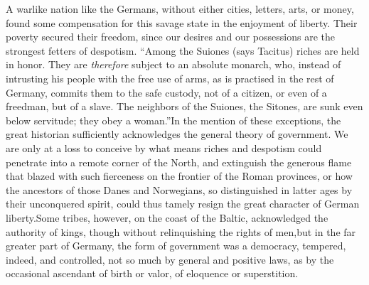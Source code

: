 


A warlike nation like the Germans, without either cities,
letters, arts, or money, found some compensation for this savage
state in the enjoyment of liberty. Their poverty secured their
freedom, since our desires and our possessions are the strongest
fetters of despotism. “Among the Suiones (says Tacitus) riches
are held in honor. They are \textit{therefore} subject to an absolute
monarch, who, instead of intrusting his people with the free use
of arms, as is practised in the rest of Germany, commits them to
the safe custody, not of a citizen, or even of a freedman, but of
a slave. The neighbors of the Suiones, the Sitones, are sunk even
below servitude; they obey a woman.”\footnotemark[41] In the mention of these
exceptions, the great historian sufficiently acknowledges the
general theory of government. We are only at a loss to conceive
by what means riches and despotism could penetrate into a remote
corner of the North, and extinguish the generous flame that
blazed with such fierceness on the frontier of the Roman
provinces, or how the ancestors of those Danes and Norwegians, so
distinguished in latter ages by their unconquered spirit, could
thus tamely resign the great character of German liberty.\footnotemark[42] Some
tribes, however, on the coast of the Baltic, acknowledged the
authority of kings, though without relinquishing the rights of
men,\footnotemark[43] but in the far greater part of Germany, the form of
government was a democracy, tempered, indeed, and controlled, not
so much by general and positive laws, as by the occasional
ascendant of birth or valor, of eloquence or superstition.\footnotemark[44]


